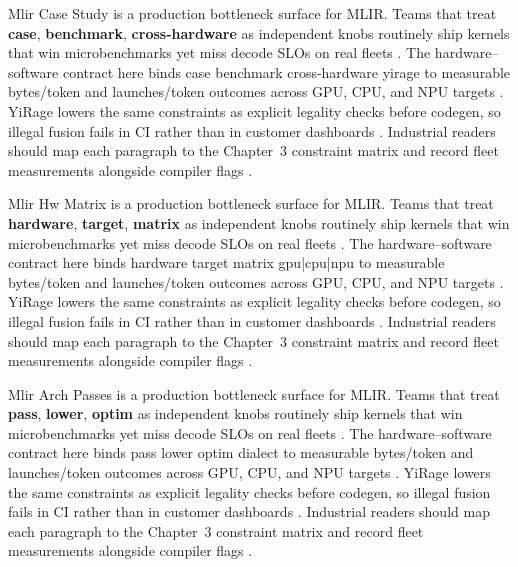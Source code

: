 Mlir Case Study is a production bottleneck surface for MLIR. Teams that treat \textbf{case}, \textbf{benchmark}, \textbf{cross-hardware} as independent knobs routinely ship kernels that win microbenchmarks yet miss decode SLOs on real fleets \citep{taxbreak2026,semianalysis2024tma}. The hardware--software contract here binds case benchmark cross-hardware yirage to measurable bytes/token and launches/token outcomes across GPU, CPU, and NPU targets \citep{memoryfloor2026,amd2024xdna}. YiRage lowers the same constraints as explicit legality checks before codegen, so illegal fusion fails in CI rather than in customer dashboards \citep{nvidia2022hopper,amd2024aie}. Industrial readers should map each paragraph to the Chapter~3 constraint matrix and record fleet measurements alongside compiler flags \citep{semianalysis2024tma,dlbook}.

Mlir Hw Matrix is a production bottleneck surface for MLIR. Teams that treat \textbf{hardware}, \textbf{target}, \textbf{matrix} as independent knobs routinely ship kernels that win microbenchmarks yet miss decode SLOs on real fleets \citep{memoryfloor2026,amd2024xdna}. The hardware--software contract here binds hardware target matrix gpu|cpu|npu to measurable bytes/token and launches/token outcomes across GPU, CPU, and NPU targets \citep{nvidia2022hopper,amd2024aie}. YiRage lowers the same constraints as explicit legality checks before codegen, so illegal fusion fails in CI rather than in customer dashboards \citep{semianalysis2024tma,dlbook}. Industrial readers should map each paragraph to the Chapter~3 constraint matrix and record fleet measurements alongside compiler flags \citep{amd2024xdna,dao2022flashattention}.

Mlir Arch Passes is a production bottleneck surface for MLIR. Teams that treat \textbf{pass}, \textbf{lower}, \textbf{optim} as independent knobs routinely ship kernels that win microbenchmarks yet miss decode SLOs on real fleets \citep{nvidia2022hopper,amd2024aie}. The hardware--software contract here binds pass lower optim dialect to measurable bytes/token and launches/token outcomes across GPU, CPU, and NPU targets \citep{semianalysis2024tma,dlbook}. YiRage lowers the same constraints as explicit legality checks before codegen, so illegal fusion fails in CI rather than in customer dashboards \citep{amd2024xdna,dao2022flashattention}. Industrial readers should map each paragraph to the Chapter~3 constraint matrix and record fleet measurements alongside compiler flags \citep{amd2024aie,kwon2023vllm}.

